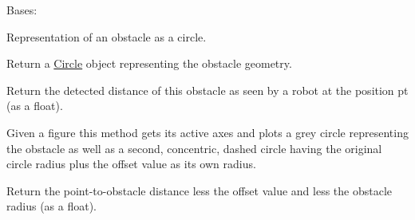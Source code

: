 \documentclass[letterpaper,10pt,english]{sphinxmanual}
\begin{document}
\begin{fulllineitems}
\label{Multi-robot motion planner:planning_sim.RoundObstacle}
Bases: {\hyperref[Multi-robot motion planner:planning_sim.Obstacle]{}}

Representation of an obstacle as a circle.

\begin{fulllineitems}
\label{Multi-robot motion planner:planning_sim.RoundObstacle._plt_circle}
Return a \href{http://matplotlib.org/api/patches\_api.html\#matplotlib.patches.Circle}{Circle} object representing the obstacle
geometry.

\end{fulllineitems}


\begin{fulllineitems}
\label{Multi-robot motion planner:planning_sim.RoundObstacle.detected_dist}
Return the detected distance of this obstacle as seen by a robot at the position pt
(as a float).

\end{fulllineitems}


\begin{fulllineitems}
\label{Multi-robot motion planner:planning_sim.RoundObstacle.plot}
Given a figure this method gets its active axes and plots a grey circle representing
the obstacle as well as a second, concentric, dashed circle having the original circle
radius plus the offset value as its own radius.

\end{fulllineitems}


\begin{fulllineitems}
\label{Multi-robot motion planner:planning_sim.RoundObstacle.pt_2_obst}
Return the point-to-obstacle distance less the offset value
and less the obstacle radius (as a float).


\end{fulllineitems}
\end{fulllineitems}
\end{document}
